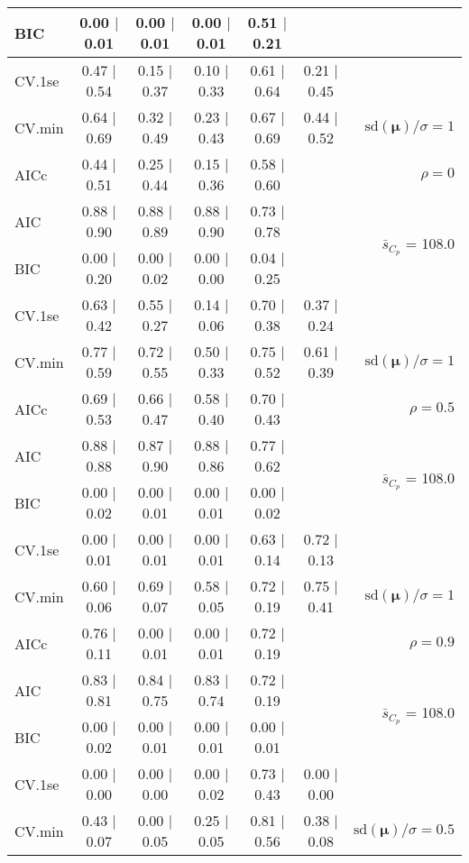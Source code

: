\documentclass[12pt]{article}
\newcommand{\mr}[1]{\mathrm{#1}}
\newcommand{\bm}[1]{\mathbf{#1}}
\begin{document}
\begin{table}[p]
\begin{center}
\begin{tabular}{l*{5}{c}|r}
BIC & 0.00 $\mid$ 0.01 & 0.00 $\mid$ 0.01 & 0.00 $\mid$ 0.01 & 0.51 $\mid$ 0.21 & & \\
 \hline 
CV.1se & 0.47 $\mid$ 0.54 & 0.15 $\mid$ 0.37 & 0.10 $\mid$ 0.33 & 0.61 $\mid$ 0.64 & 0.21 $\mid$ 0.45 &\\
CV.min & 0.64 $\mid$ 0.69 & 0.32 $\mid$ 0.49 & 0.23 $\mid$ 0.43 & 0.67 $\mid$ 0.69 & 0.44 $\mid$ 0.52 &  $\mr{sd}(\bm{\mu})/\sigma=1$ \\
AICc & 0.44 $\mid$ 0.51 & 0.25 $\mid$ 0.44 & 0.15 $\mid$ 0.36 & 0.58 $\mid$ 0.60 & & $\rho=0$ \\
AIC & 0.88 $\mid$ 0.90 & 0.88 $\mid$ 0.89 & 0.88 $\mid$ 0.90 & 0.73 $\mid$ 0.78 & & \multirow{2}{*}{$\bar{s}_{C_p}$ = 108.0} \\
BIC & 0.00 $\mid$ 0.20 & 0.00 $\mid$ 0.02 & 0.00 $\mid$ 0.00 & 0.04 $\mid$ 0.25 & & \\
 \hline 
CV.1se & 0.63 $\mid$ 0.42 & 0.55 $\mid$ 0.27 & 0.14 $\mid$ 0.06 & 0.70 $\mid$ 0.38 & 0.37 $\mid$ 0.24 &\\
CV.min & 0.77 $\mid$ 0.59 & 0.72 $\mid$ 0.55 & 0.50 $\mid$ 0.33 & 0.75 $\mid$ 0.52 & 0.61 $\mid$ 0.39 &  $\mr{sd}(\bm{\mu})/\sigma=1$ \\
AICc & 0.69 $\mid$ 0.53 & 0.66 $\mid$ 0.47 & 0.58 $\mid$ 0.40 & 0.70 $\mid$ 0.43 & & $\rho=0.5$ \\
AIC & 0.88 $\mid$ 0.88 & 0.87 $\mid$ 0.90 & 0.88 $\mid$ 0.86 & 0.77 $\mid$ 0.62 & & \multirow{2}{*}{$\bar{s}_{C_p}$ = 108.0} \\
BIC & 0.00 $\mid$ 0.02 & 0.00 $\mid$ 0.01 & 0.00 $\mid$ 0.01 & 0.00 $\mid$ 0.02 & & \\
 \hline 
CV.1se & 0.00 $\mid$ 0.01 & 0.00 $\mid$ 0.01 & 0.00 $\mid$ 0.01 & 0.63 $\mid$ 0.14 & 0.72 $\mid$ 0.13 &\\
CV.min & 0.60 $\mid$ 0.06 & 0.69 $\mid$ 0.07 & 0.58 $\mid$ 0.05 & 0.72 $\mid$ 0.19 & 0.75 $\mid$ 0.41 &  $\mr{sd}(\bm{\mu})/\sigma=1$ \\
AICc & 0.76 $\mid$ 0.11 & 0.00 $\mid$ 0.01 & 0.00 $\mid$ 0.01 & 0.72 $\mid$ 0.19 & & $\rho=0.9$ \\
AIC & 0.83 $\mid$ 0.81 & 0.84 $\mid$ 0.75 & 0.83 $\mid$ 0.74 & 0.72 $\mid$ 0.19 & & \multirow{2}{*}{$\bar{s}_{C_p}$ = 108.0} \\
BIC & 0.00 $\mid$ 0.02 & 0.00 $\mid$ 0.01 & 0.00 $\mid$ 0.01 & 0.00 $\mid$ 0.01 & & \\
 \hline 
CV.1se & 0.00 $\mid$ 0.00 & 0.00 $\mid$ 0.00 & 0.00 $\mid$ 0.02 & 0.73 $\mid$ 0.43 & 0.00 $\mid$ 0.00 &\\
CV.min & 0.43 $\mid$ 0.07 & 0.00 $\mid$ 0.05 & 0.25 $\mid$ 0.05 & 0.81 $\mid$ 0.56 & 0.38 $\mid$ 0.08 &  $\mr{sd}(\bm{\mu})/\sigma=0.5$ \\

\end{tabular}
\end{center}
\end{table}
\end{document}
